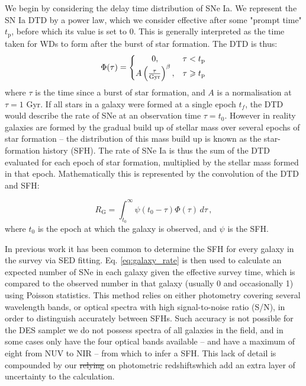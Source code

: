 \documentclass[fleqn,usenatbib]{mnras}
\providecommand{\DIFadd}[1]{{\protect\color{blue}\uwave{#1}}} %
\providecommand{\DIFdel}[1]{{\protect\color{red}\sout{#1}}}                      %
\providecommand{\DIFaddbegin}{} %
\providecommand{\DIFaddend}{} %
\providecommand{\DIFdelbegin}{} %
\providecommand{\DIFdelend}{} %
\newcommand{\DIFscaledelfig}{0.5}
\newlength{\DIFdelgraphicswidth} %
\newlength{\DIFdelgraphicsheight} %
\newcommand{\DIFaddincludegraphics}[2][]{{\color{blue}\fbox{\DIFOincludegraphics[#1]{#2}}}} %
\newcommand{\DIFdelincludegraphics}[2][]{%
\sbox{\DIFdelgraphicsbox}{\DIFOincludegraphics[#1]{#2}}%
\settoboxwidth{\DIFdelgraphicswidth}{\DIFdelgraphicsbox} %
\settoboxtotalheight{\DIFdelgraphicsheight}{\DIFdelgraphicsbox} %
\scalebox{\DIFscaledelfig}{%
\parbox[b]{\DIFdelgraphicswidth}{\usebox{\DIFdelgraphicsbox}\\[-\baselineskip] \rule{\DIFdelgraphicswidth}{0em}}\llap{\resizebox{\DIFdelgraphicswidth}{\DIFdelgraphicsheight}{%
\setlength{\unitlength}{\DIFdelgraphicswidth}%
\begin{picture}(1,1)%
\thicklines\linethickness{2pt} %
{\color[rgb]{1,0,0}\put(0,0){\framebox(1,1){}}}%
{\color[rgb]{1,0,0}\put(0,0){\line( 1,1){1}}}%
{\color[rgb]{1,0,0}\put(0,1){\line(1,-1){1}}}%
\end{picture}%
}\hspace*{3pt}}} %
} %
\DeclareRobustCommand{\DIFaddbegin}{\DIFOaddbegin \let\includegraphics\DIFaddincludegraphics} %
\DeclareRobustCommand{\DIFaddend}{\DIFOaddend \let\includegraphics\DIFOincludegraphics} %
\DeclareRobustCommand{\DIFdelbegin}{\DIFOdelbegin \let\includegraphics\DIFdelincludegraphics} %
\DeclareRobustCommand{\DIFdelend}{\DIFOaddend \let\includegraphics\DIFOincludegraphics} %
\begin{document}
We begin by considering the delay time distribution of SNe Ia.
We represent the SN Ia DTD by a power law, which we consider effective after some "prompt time" $t_{\mathrm{p}}$, before which its value is set to 0. This is generally interpreted as the time taken for WDs to form after the burst of star formation. The DTD is thus:
\begin{equation}
 \Phi(\tau) = \left\{
    \begin{array}{@{}cc@{}}
    0 , & \tau < t_{\mathrm{p}} \\
    A\left(\frac{\tau}{\mathrm{Gyr}}\right)^{\beta} , & \tau \geq t_{\mathrm{p}}
    \end{array}\right.
        \label{eq:dtd}
\end{equation} 
where $\tau$ is the time since a burst of star formation, and $A$ is a normalisation at $\tau=1$ Gyr. If all stars in a galaxy were formed at a single epoch $t_f$, the DTD would describe the rate of SNe at an observation time $\tau = t_0$. However in reality galaxies are formed by the gradual build up of stellar mass over several epochs of star formation -- the distribution of this mass build up is known as the star-formation history (SFH). The rate of SNe Ia is thus the sum of the DTD evaluated for each epoch of star formation, multiplied by the stellar mass formed in that epoch. Mathematically this is represented by the convolution of the DTD and SFH:

\begin{equation}
    R_{\mathrm{G}} = \int_{t_0}^{\infty} \psi(t_0-\tau)\Phi(\tau)\,d\tau \,,
    \label{eq:galaxy_rate}
\end{equation}
where $t_0$ is the epoch at which the galaxy is observed, and $\psi$ is the SFH. 

In previous work \citep[e.g.][]{Strolger2004,Maoz2012} it has been common to determine the SFH for every galaxy in the survey via SED fitting. Eq. \ref{eq:galaxy_rate} is then used to calculate an expected number of SNe in each galaxy given the effective survey time, which is compared to the observed number in that galaxy (usually 0 and occasionally 1) using Poisson statistics. This method relies on either photometry covering several wavelength bands, or optical spectra with \DIFaddbegin \DIFadd{a }\DIFaddend high signal-to-noise ratio (S/N), in order to distinguish accurately between SFHs. Such accuracy is not possible for the DES sample\DIFdelbegin \DIFdel{: }\DIFdelend \DIFaddbegin \DIFadd{; }\DIFaddend we do not possess spectra of all galaxies in the field, and in some cases only have the four optical bands available -- and have a maximum of eight from NUV to NIR -- from which to infer a SFH. This lack of detail is compounded by our \DIFdelbegin \DIFdel{relying }\DIFdelend \DIFaddbegin \DIFadd{reliance }\DIFaddend on photometric redshifts\DIFaddbegin \DIFadd{, }\DIFaddend which add an extra layer of uncertainty to the calculation. 
\end{document}
